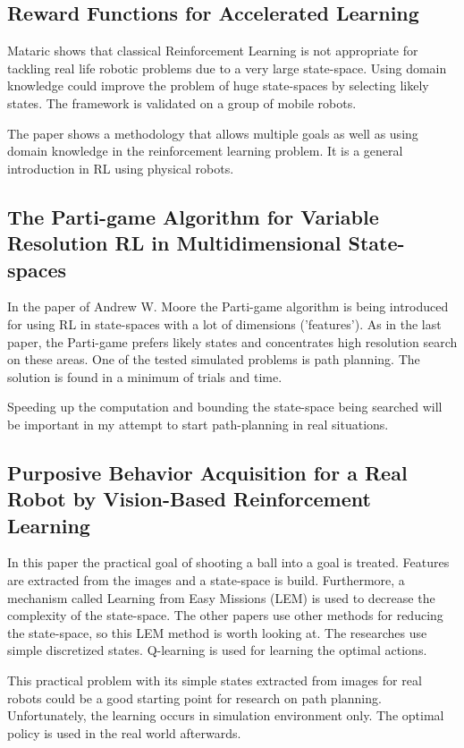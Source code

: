 \documentclass[11pt]{article}
\begin{document}
\subsection*{Reward Functions for Accelerated Learning}
Mataric \cite{mataric} shows that classical Reinforcement Learning is not appropriate for tackling real life robotic problems due to a very large state-space. Using domain knowledge could improve the problem of huge state-spaces by selecting likely states. The framework is validated on a group of mobile robots.

The paper shows a methodology that allows multiple goals as well as using domain knowledge in the reinforcement learning problem. It is a general introduction in RL using physical robots.

\subsection*{The Parti-game Algorithm for Variable Resolution RL in Multidimensional State-spaces}
In the paper of Andrew W. Moore \cite{moore} the Parti-game algorithm is being introduced for using RL in state-spaces with a lot of dimensions ('features'). As in the last paper, the Parti-game prefers likely states and concentrates high resolution search on these areas. One of the tested simulated problems is path planning. The solution is found in a minimum of trials and time.

Speeding up the computation and bounding the state-space being searched will be important in my attempt to start path-planning in real situations.

\subsection*{Purposive Behavior Acquisition for a Real Robot by Vision-Based Reinforcement Learning}
In this paper \cite{asada} the practical goal of shooting a ball into a goal is treated. Features are extracted from the images and a state-space is build. Furthermore, a mechanism called Learning from Easy Missions (LEM) is used to decrease the complexity of the state-space. The other papers use other methods for reducing the state-space, so this LEM method is worth looking at. The researches use simple discretized states. Q-learning is used for learning the optimal actions.

This practical problem with its simple states extracted from images for real robots could be a good starting point for research on path planning. Unfortunately, the learning occurs in simulation environment only. The optimal policy is used in the real world afterwards.
\end{document}
